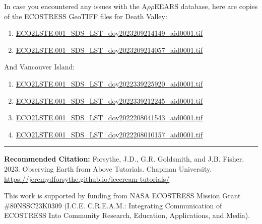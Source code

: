 \documentclass[oneside,a4paper,11pt,explicit]{book}
\begin{document}
\begin{tcolorbox}[colback=yellow!5!white,title=\textbf{Datafiles}]
	\large
	In case you encountered any issues with the A$\rho\rho$EEARS database, here are copies of the ECOSTRESS GeoTIFF files for Death Valley:
	\begin{enumerate}
		\item \href{https://jeremydforsythe.github.io/icecream-tutorials/Tutorial2_AccessingRemoteSensingDataWithAppears/ECO2LSTE.001_SDS_LST_doy2023209214149_aid0001.tif}{ECO2LSTE.001\_SDS\_LST\_doy2023209214149\_aid0001.tif}
		\item \href{https://jeremydforsythe.github.io/icecream-tutorials/Tutorial2_AccessingRemoteSensingDataWithAppears/ECO2LSTE.001_SDS_LST_doy2023209214057_aid0001.tif}{ECO2LSTE.001\_SDS\_LST\_doy2023209214057\_aid0001.tif}
	\end{enumerate}
	And Vancouver Island:
	\begin{enumerate}
		\item \href{https://jeremydforsythe.github.io/icecream-tutorials/Tutorial5_AddingElementsToMaps/ECO2LSTE.001_SDS_LST_doy2022339225920_aid0001.tif}{ECO2LSTE.001\_SDS\_LST\_doy2022339225920\_aid0001.tif}
		\item \href{https://jeremydforsythe.github.io/icecream-tutorials/Tutorial5_AddingElementsToMaps/ECO2LSTE.001_SDS_LST_doy2022339212245_aid0001.tif}{ECO2LSTE.001\_SDS\_LST\_doy2022339212245\_aid0001.tif}
		\item \href{https://jeremydforsythe.github.io/icecream-tutorials/Tutorial5_AddingElementsToMaps/ECO2LSTE.001_SDS_LST_doy2022208041543_aid0001.tif}{ECO2LSTE.001\_SDS\_LST\_doy2022208041543\_aid0001.tif}
		\item \href{https://jeremydforsythe.github.io/icecream-tutorials/Tutorial5_AddingElementsToMaps/ECO2LSTE.001_SDS_LST_doy2022208010157_aid0001.tif}{ECO2LSTE.001\_SDS\_LST\_doy2022208010157\_aid0001.tif}
	\end{enumerate}
\end{tcolorbox}


\hrule

\vspace{1em}

\small \textbf{Recommended Citation:} Forsythe, J.D., G.R. Goldsmith, and J.B. Fisher. 2023. Observing Earth from Above Tutorials. Chapman University. \url{https://jeremydforsythe.github.io/icecream-tutorials/}

\vspace{1em}

This work is supported by funding from NASA ECOSTRESS Mission Grant \#80NSSC23K0309 (I.C.E. C.R.E.A.M.: Integrating Communication of ECOSTRESS Into Community Research, Education, Applications, and Media).
\end{document}
